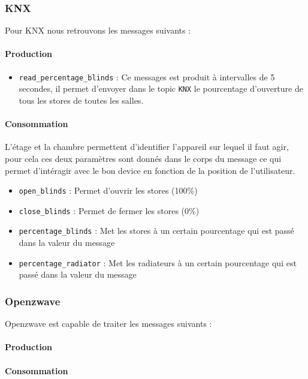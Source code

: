 \subsubsection{KNX}
Pour KNX nous retrouvons les messages suivants : 
\paragraph{Production}
\begin{itemize}
    \item \texttt{read_percentage_blinds} : Ce messages est produit à intervalles de 5 secondes, il permet d'envoyer dans le topic \texttt{KNX} le pourcentage d'ouverture de tous les stores de toutes les salles. 
\end{itemize}

\paragraph{Consommation}
    L'étage et la chambre permettent d'identifier l'appareil sur lequel il faut agir, pour cela ces deux paramètres sont donnés dans le corps du message ce qui permet d'intéragir avec le bon device en fonction de la position de l'utilisateur.
\begin{itemize}
    \item \texttt{open_blinds} : Permet d'ouvrir les stores (100\%)
    \item \texttt{close_blinds} : Permet de fermer les stores (0\%)
    \item \texttt{percentage_blinds} : Met les stores à un certain pourcentage qui est passé dans la valeur du message
    \item \texttt{percentage_radiator} : Met les radiateurs à un certain pourcentage qui est passé dans la valeur du message
\end{itemize}

\subsubsection{Openzwave}
Openzwave est capable de traiter les messages suivants : 
\paragraph{Production}

\paragraph{Consommation}

